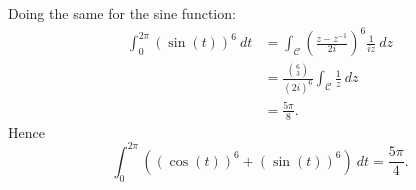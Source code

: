 \begin{solution}
Doing the same for the sine function:
\begin{align*}
\int_0^{2\pi} \left( \sin (t) \right)^6\ dt &= \int_{\mathcal{C}} \left( \frac{z-z^{-1}}{2i} \right)^6 \frac{1}{iz}\ dz \\
& = \frac{\binom{6}{3}}{(2i)^6} \int_{\mathcal{C}} \frac{1}{z}\ dz \\
& = \frac{5\pi}{8}.
\end{align*}
Hence
\[
\int_0^{2\pi} \left( (\cos(t))^6+(\sin (t))^6 \right)\ dt = \frac{5\pi}{4}.
\]
\end{solution}
\begin{comment}
\section{The Taylor Series of a Holomorphic Function}
\begin{theorem}{Taylor Series}
\label{t:taylor}
Let $w \in \C$, $r>0$ and let $f$ be holomorphic on $D(w,r)$.  Then there exist coefficients $c_1,c_2,\ldots \in \C$ such that
\[
f(z) = \sum_{n=0}^{\infty} c_n (z-w)^n
\]
for all $z \in D(w,r)$.
\end{theorem} 
To say that 
\[
f(z) = \sum_{n=0}^{\infty} c_n (z-w)^n,
\]
we mean that the series on the right hand side converges to $f(z)$.  In other words,
\[
\lim_{n \to \infty} \abs{ f(z) - \sum_{n=0}^{\infty} c_n (z-w)^n} =0
\]
for all $z \in D(w,r)$.  The sums $\displaystyle \sum_{k=0}^n c_k (z-w)^k$ are called the \emph{partial sums} of the series $\displaystyle \sum_{k=0}^{\infty} c_k (z-w)^k$.  The series $\displaystyle \sum_{k=0}^{\infty} c_k (z-w)^k$ itself is called the \emph{Taylor Series (expansion) of $f$ at $w$}, or sometimes the \emph{Power Series} expansion of $f$ at $w$.

We can of course rewrite as
\[
f(w+h) = \sum_{n=0}^{\infty} c_n h^n
\]
whenever $\abs{h} <R$.

\begin{proof}{(of Theorem~\ref{t:taylor})}

\end{proof}
\end{comment}